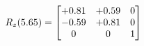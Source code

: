 \documentclass[preview]{standalone}
\begin{document}
\begin{align*}
\special{dvisvgm:raw <g id='unique000'>}R_{z}(5.65) = \begin{bmatrix}+0.81 & +0.59 & 0 \\-0.59 & +0.81 & 0 \\0 & 0 & 1\end{bmatrix}\special{dvisvgm:raw </g>}
\end{align*}
\end{document}
